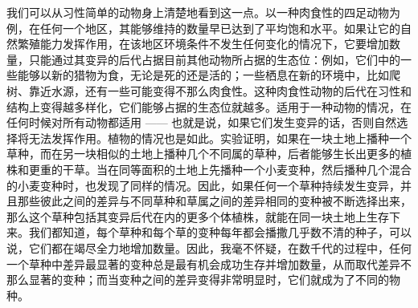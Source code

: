 \documentclass{article}
\begin{document}
我们可以从习性简单的动物身上清楚地看到这一点。以一种肉食性的四足动物为例，在任何一个地区，其能够维持的数量早已达到了平均饱和水平。如果让它的自然繁殖能力发挥作用，在该地区环境条件不发生任何变化的情况下，它要增加数量，只能通过其变异的后代占据目前其他动物所占据的生态位：例如，它们中的一些能够以新的猎物为食，无论是死的还是活的；一些栖息在新的环境中，比如爬树、靠近水源，还有一些可能变得不那么肉食性。这种肉食性动物的后代在习性和结构上变得越多样化，它们能够占据的生态位就越多。适用于一种动物的情况，在任何时候对所有动物都适用 —— 也就是说，如果它们发生变异的话，否则自然选择将无法发挥作用。植物的情况也是如此。实验证明，如果在一块土地上播种一个草种，而在另一块相似的土地上播种几个不同属的草种，后者能够生长出更多的植株和更重的干草。当在同等面积的土地上先播种一个小麦变种，然后播种几个混合的小麦变种时，也发现了同样的情况。因此，如果任何一个草种持续发生变异，并且那些彼此之间的差异与不同草种和草属之间的差异相同的变种被不断选择出来，那么这个草种包括其变异后代在内的更多个体植株，就能在同一块土地上生存下来。我们都知道，每个草种和每个草的变种每年都会播撒几乎数不清的种子，可以说，它们都在竭尽全力地增加数量。因此，我毫不怀疑，在数千代的过程中，任何一个草种中差异最显著的变种总是最有机会成功生存并增加数量，从而取代差异不那么显著的变种；而当变种之间的差异变得非常明显时，它们就成为了不同的物种。\\ 
\end{document}
